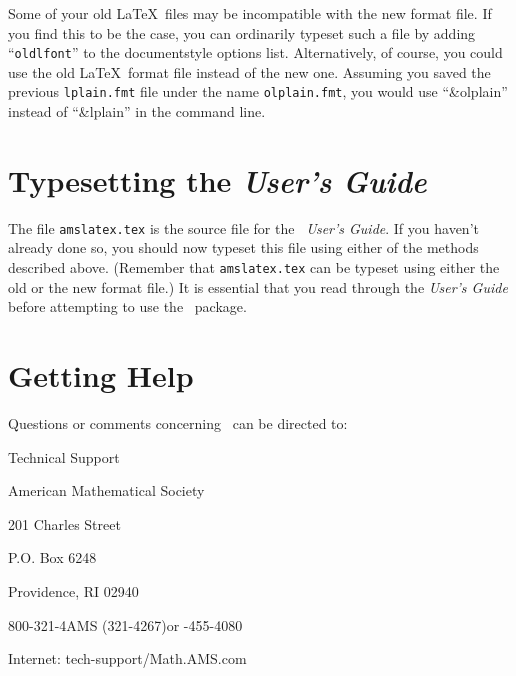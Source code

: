 Some of your old \LaTeX\ files may be incompatible with the new format
file. If you find this to be the case, you can ordinarily typeset such
a file by adding ``{\tt oldlfont}'' to the documentstyle options list.
Alternatively, of course, you could use the old \LaTeX\ format file
instead of the new one.  Assuming you saved the previous
\verb+lplain.fmt+  file under the name \verb+olplain.fmt+, you would
use ``\&olplain'' instead of  ``\&lplain'' in the command line.


\section{Typesetting the {\it User's Guide}}

The file \verb+amslatex.tex+ is the source file for the {\it \amslatex\
User's Guide}.  If you haven't already done so, you should now typeset this file
using either of the methods described above.  (Remember that
\verb+amslatex.tex+ can be typeset using either the old or the new format
file.)  It is essential that you read through the {\it User's Guide\/} before
attempting to use the \amslatex\ package.


\section{Getting Help}

Questions or comments concerning \amslatex\ 
can be directed to:


\vskip1pc
\parindent1in\parskip0pt

Technical Support

American Mathematical Society

201 Charles Street

P.O. Box 6248

Providence, RI 02940

800-321-4AMS (321-4267)\quad or -455-4080

Internet: tech-support\atsign/Math.AMS.com


